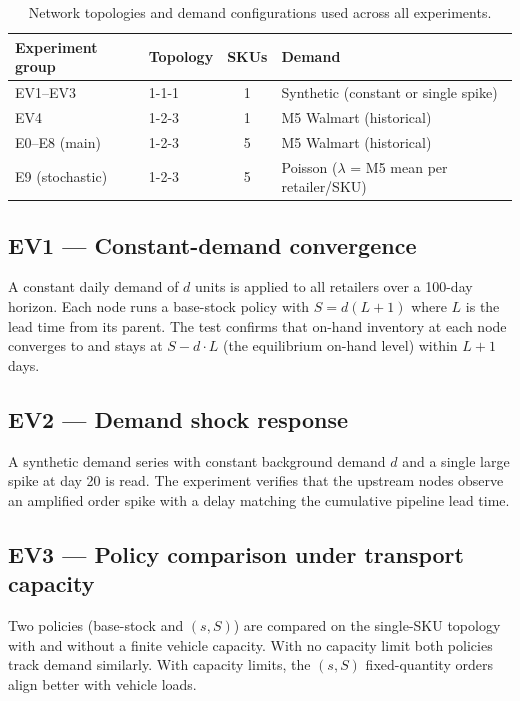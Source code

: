 \begin{table}[htbp]
  \centering
  \small
  \caption{Network topologies and demand configurations used across all experiments.}
  \label{tab:topology-overview}
  \begin{tabular}{@{}llcl@{}}
    \toprule
    Experiment group & Topology & SKUs & Demand \\
    \midrule
    EV1--EV3 & 1-1-1 & 1 & Synthetic (constant or single spike) \\
    EV4      & 1-2-3 & 1 & M5 Walmart (historical) \\
    E0--E8 (main) & 1-2-3 & 5 & M5 Walmart (historical) \\
    E9 (stochastic) & 1-2-3 & 5 & Poisson ($\lambda$ = M5 mean per retailer/SKU) \\
    \bottomrule
  \end{tabular}
\end{table}

\subsection{EV1 --- Constant-demand convergence}
\label{sec:meth:ev1}

A constant daily demand of $d$ units is applied to all retailers over
a 100-day horizon.  Each node runs a base-stock policy with
$S = d(L+1)$ where $L$ is the lead time from its parent.  The test
confirms that on-hand inventory at each node converges to and stays at
$S - d \cdot L$ (the equilibrium on-hand level) within $L+1$ days.

\subsection{EV2 --- Demand shock response}
\label{sec:meth:ev2}

A synthetic demand series with constant background demand $d$ and a
single large spike at day 20 is read.
The experiment verifies that the upstream nodes observe an amplified order
spike with a delay matching the cumulative pipeline lead time.

\subsection{EV3 --- Policy comparison under transport capacity}
\label{sec:meth:ev3}

Two policies (base-stock and $(s,S)$) are compared on the single-SKU
topology with and without a finite vehicle capacity.  With no capacity
limit both policies track demand similarly.  With capacity limits, the
$(s,S)$ fixed-quantity orders align better with vehicle loads.

